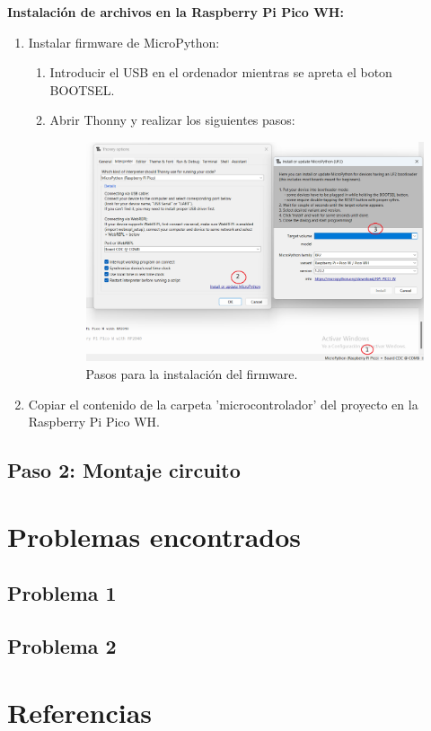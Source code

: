 \documentclass{article}
\begin{document}
\textbf{Instalación de archivos en la Raspberry Pi Pico WH:}
\begin{enumerate}
	\item Instalar firmware de MicroPython:
		\begin{enumerate}
			\item Introducir el USB en el ordenador mientras se apreta el boton BOOTSEL.
			\item Abrir Thonny y realizar los siguientes pasos:
			\begin{figure}[h]
			\centering
			\includegraphics[width=0.8\linewidth]{../images/instalacion_firmware.png}
			\caption{\label{fig:instalación firmware}Pasos para la instalación del firmware.}
			\end{figure}
		\end{enumerate}
			\item Copiar el contenido de la carpeta 'microcontrolador' del proyecto en la Raspberry Pi Pico WH.
\end{enumerate}

	

\subsection{Paso 2: Montaje circuito}
\section{Problemas encontrados}
\subsection{Problema 1} 
\subsection{Problema 2}
\section{Referencias}
\end{document}
